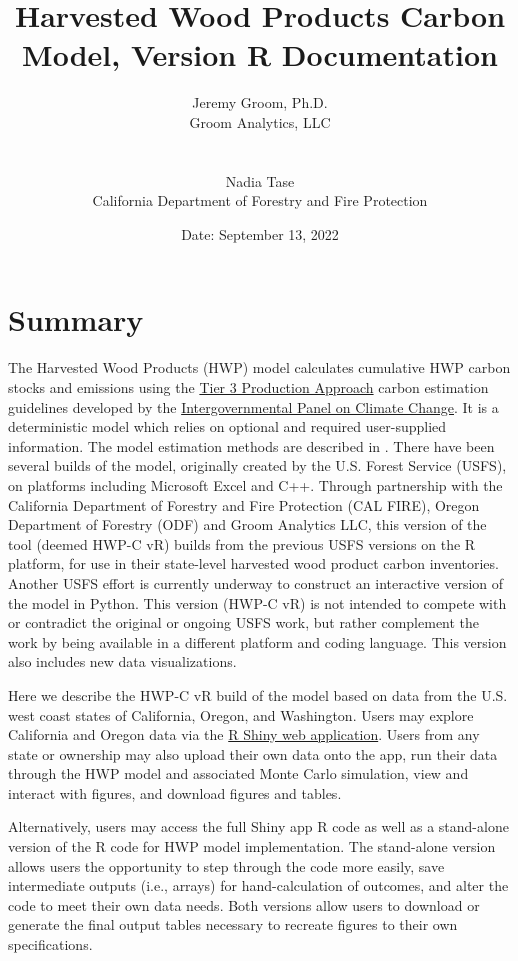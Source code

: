 \documentclass[
  openany]{book}
\title{Harvested Wood Products Carbon Model, Version R Documentation}
\author{Jeremy Groom, Ph.D.\\
Groom Analytics, LLC\\
\strut \\
Nadia Tase\\
California Department of Forestry and Fire Protection}
\date{Date: September 13, 2022}
\begin{document}
\maketitle

{
\setcounter{tocdepth}{1}
\tableofcontents
}
\hypertarget{sum}{%
\chapter{Summary}\label{sum}}

The Harvested Wood Products (HWP) model calculates cumulative HWP carbon stocks and emissions using the \href{https://www.ipcc-nggip.iges.or.jp/public/2006gl/pdf/4_Volume4/V4_04_Ch4_Forest_Land.pdf}{Tier 3 Production Approach} carbon estimation guidelines developed by the \href{https://www.ipcc.ch/}{Intergovernmental Panel on Climate Change}. It is a deterministic model which relies on optional and required user-supplied information. The model estimation methods are described in \textcite{stockmann2012}. There have been several builds of the model, originally created by the U.S. Forest Service (USFS), on platforms including Microsoft Excel and C++. Through partnership with the California Department of Forestry and Fire Protection (CAL FIRE), Oregon Department of Forestry (ODF) and Groom Analytics LLC, this version of the tool (deemed HWP-C vR) builds from the previous USFS versions on the R \autocite{R-base} platform, for use in their state-level harvested wood product carbon inventories. Another USFS effort is currently underway to construct an interactive version of the model in Python. This version (HWP-C vR) is not intended to compete with or contradict the original or ongoing USFS work, but rather complement the work by being available in a different platform and coding language. This version also includes new data visualizations.

Here we describe the HWP-C vR build of the model based on data from the U.S. west coast states of California, Oregon, and Washington. Users may explore California and Oregon data via the \href{https://groomanalyticsllc.shinyapps.io/HWP-C-vR/}{R Shiny web application}. Users from any state or ownership may also upload their own data onto the app, run their data through the HWP model and associated Monte Carlo simulation, view and interact with figures, and download figures and tables.

Alternatively, users may access the full Shiny app R code as well as a stand-alone version of the R code for HWP model implementation. The stand-alone version allows users the opportunity to step through the code more easily, save intermediate outputs (i.e., arrays) for hand-calculation of outcomes, and alter the code to meet their own data needs. Both versions allow users to download or generate the final output tables necessary to recreate figures to their own specifications.
\end{document}
